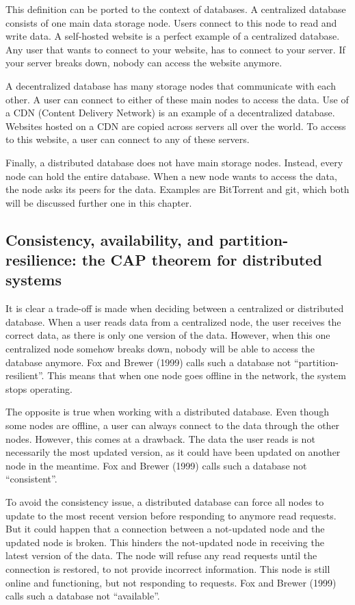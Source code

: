 This definition can be ported to the context of databases. A centralized database consists of one main data storage node. Users connect to this node to read and write data. A self-hosted website is a perfect example of a centralized database. Any user that wants to connect to your website, has to connect to your server. If your server breaks down, nobody can access the website anymore.

A decentralized database has many storage nodes that communicate with each other. A user can connect to either of these main nodes to access the data. Use of a CDN (Content Delivery Network) is an example of a decentralized database. Websites hosted on a CDN are copied across servers all over the world. To access to this website, a user can connect to any of these servers.

Finally, a distributed database does not have main storage nodes. Instead, every node can hold the entire database. When a new node wants to access the data, the node asks its peers for the data. Examples are BitTorrent and git, which both will be discussed further one in this chapter.

\subsection{Consistency, availability, and partition-resilience: the CAP theorem for distributed systems}

It is clear a trade-off is made when deciding between a centralized or distributed database. When a user reads data from a centralized node, the user receives the correct data, as there is only one version of the data. However, when this one centralized node somehow breaks down, nobody will be able to access the database anymore. Fox and Brewer (1999) \cite{brewers-theorem-paper} calls such a database not ``partition-resilient''. This means that when one node goes offline in the network, the system stops operating.

The opposite is true when working with a distributed database. Even though some nodes are offline, a user can always connect to the data through the other nodes. However, this comes at a drawback. The data the user reads is not necessarily the most updated version, as it could have been updated on another node in the meantime. Fox and Brewer (1999) calls such a database not ``consistent''.

To avoid the consistency issue, a distributed database can force all nodes to update to the most recent version before responding to anymore read requests. But it could happen that a connection between a not-updated node and the updated node is broken. This hinders the not-updated node in receiving the latest version of the data. The node will refuse any read requests until the connection is restored, to not provide incorrect information. This node is still online and functioning, but not responding to requests. Fox and Brewer (1999) calls such a database not ``available''.

